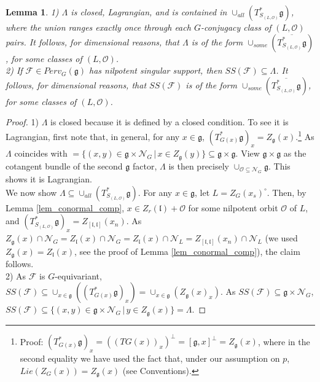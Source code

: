 \documentclass[10pt,a4paper]{amsart}
\newtheorem{lemma}{Lemma}
\newcommand{\CF}{\mathcal{F}}
\newcommand{\CN}{\mathcal{N}}
\newcommand{\CO}{\mathcal{O}}
\newcommand{\X}{\times}
\newcommand{\fl}{\mathfrak{l}}
\newcommand{\g}{\mathfrak{g}}
\begin{document}
\begin{lemma}\label{lem_form_of_SS}
    1) $\Lambda$ is closed, Lagrangian, and is contained in $\cup_{all} (T^*_{S_{(L,\CO)}}\g)$, where the union ranges exactly once through each $G$-conjugacy class of $(L,\CO)$ pairs. It follows, for dimensional reasons, that $\Lambda$ is of the form $\cup_{some} (\overline{T^*_{S_{(L,\CO)}}\g})$, for some classes of $(L,\CO)$.\\
    2) If $\CF\in Perv_G(\g)$ has nilpotent singular support, then $SS(\CF)\subseteq \Lambda$. It follows, for dimensional reasons, that $SS(\CF)$ is of the form $\cup_{some} (\overline{T^*_{S_{(L,\CO)}}\g})$, for some classes of $(L,\CO)$.
\end{lemma}

\begin{proof}
    1) $\Lambda$ is closed because it is defined by a closed condition. To see it is Lagrangian, first note that, in general, for any $x\in\g$, $(T^*_{G(x)}\g)_x=Z_\g(x)$.\footnote{Proof: $(T^*_{G(x)}\g)_x=((TG(x))_x)^\perp=[\g,x]^\perp=Z_\g(x)$, where in the second equality we have used the fact that, under our assumption on $p$, $Lie(Z_G(x))=Z_\g(x)$ (see Conventions).} As $\Lambda$ coincides with $=\{(x,y)\in\g\X\CN_G\,|\, x\in Z_\g(y)\}\subseteq \g\X\g$. View $\g\X\g$ as the cotangent bundle of the second $\g$ factor, $\Lambda$ is then precisely $\cup_{\CO\subseteq\CN_G}\g$. This shows it is Lagrangian.\\
    
    We now show $\Lambda\subseteq\cup_{all} (T^*_{S_{(L,\CO)}}\g)$. For any $x\in\g$, let $L=Z_G(x_s)^\circ$. Then, by Lemma \ref{lem_conormal_comp}, $x\in Z_r(\fl)+\CO$ for some nilpotent orbit $\CO$ of $L$, and $(T^*_{S_{(L,\CO)}}\g)_x=Z_{[\fl,\fl]}(x_n)$. As $Z_\g(x)\cap\CN_G=Z_\fl(x)\cap\CN_G=Z_\fl(x)\cap\CN_L=Z_{[\fl,\fl]}(x_n)\cap\CN_L$ (we used $Z_\g(x)=Z_\fl(x)$, see the proof of Lemma \ref{lem_conormal_comp}), the claim follows.\\

    2) As $\CF$ is $G$-equivariant, $SS(\CF)\subseteq \cup_{x\in \g}((T^*_{G(x)}\g)_x)=\cup_{x\in \g}(Z_\g(x)_x)$. As $SS(\CF)\subseteq \g\X\CN_G$, $SS(\CF)\subseteq\{(x,y)\in\g\X\CN_G\,|\, y\in Z_\g(x)\}=\Lambda$.
\end{proof}
\end{document}
